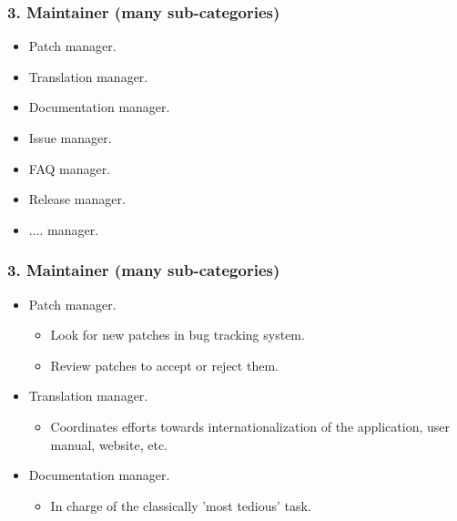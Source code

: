 \documentclass{beamer}
\begin{document}

\begin{frame}
 \frametitle{3. Maintainer (many sub-categories)}
\begin{itemize}
  \item Patch manager.
  \item Translation manager.
  \item Documentation manager.
  \item Issue manager.
  \item FAQ manager.
  \item Release manager.
  \item .... manager.
\end{itemize}

\end{frame}


\begin{frame}
 \frametitle{3. Maintainer (many sub-categories)}
  \begin{itemize}
   \item Patch manager.
   \begin{itemize}
    \item Look for new patches in bug tracking system.
    \item Review patches to accept or reject them.
   \end{itemize}

   \item Translation manager.
   \begin{itemize}
    \item Coordinates efforts towards internationalization 
    of the application, user manual, website, etc.
   \end{itemize}

   \item Documentation manager.
   \begin{itemize}
    \item In charge of the classically 'most tedious' task.
   \end{itemize}

  \end{itemize}

\end{frame}

\end{document}
